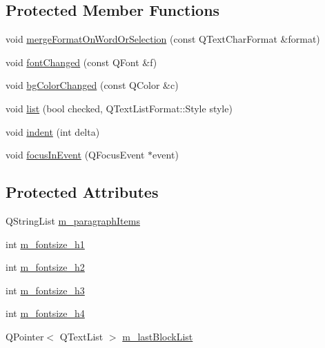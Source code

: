 \subsection*{Protected Member Functions}
\begin{DoxyCompactItemize}
\item 
void \hyperlink{class_m_rich_text_edit_afa3261f0c4458b9303770d2c303f8eae}{merge\+Format\+On\+Word\+Or\+Selection} (const Q\+Text\+Char\+Format \&format)
\item 
void \hyperlink{class_m_rich_text_edit_a863c49639f8ce2cb6d2a42a412ace7ea}{font\+Changed} (const Q\+Font \&f)
\item 
void \hyperlink{class_m_rich_text_edit_aed02db65eb8eafdae00e1f1226a64fa2}{bg\+Color\+Changed} (const Q\+Color \&c)
\item 
void \hyperlink{class_m_rich_text_edit_abeb44a927ac5e727aff6e8655a889cfa}{list} (bool checked, Q\+Text\+List\+Format\+::\+Style style)
\item 
void \hyperlink{class_m_rich_text_edit_ad1185def8aff6d92df93df7d09175602}{indent} (int delta)
\item 
void \hyperlink{class_m_rich_text_edit_a553669aed3e5ade3417fe7244ed6dc3d}{focus\+In\+Event} (Q\+Focus\+Event $\ast$event)
\end{DoxyCompactItemize}
\subsection*{Protected Attributes}
\begin{DoxyCompactItemize}
\item 
Q\+String\+List \hyperlink{class_m_rich_text_edit_af34c4871f9e7e840bd360f4361f71f7f}{m\+\_\+paragraph\+Items}
\item 
int \hyperlink{class_m_rich_text_edit_a21412018cac537d252d926966915f18a}{m\+\_\+fontsize\+\_\+h1}
\item 
int \hyperlink{class_m_rich_text_edit_aa96403182b52ad9d800160ef7da7a5f9}{m\+\_\+fontsize\+\_\+h2}
\item 
int \hyperlink{class_m_rich_text_edit_a554fa39ad6205ca5706f99ac95ff6f71}{m\+\_\+fontsize\+\_\+h3}
\item 
int \hyperlink{class_m_rich_text_edit_ad96b26841fbd45e39a7e7919c7ef9475}{m\+\_\+fontsize\+\_\+h4}
\item 
Q\+Pointer$<$ Q\+Text\+List $>$ \hyperlink{class_m_rich_text_edit_ad6053d0251ea8fb0d315aa9239b26888}{m\+\_\+last\+Block\+List}
\end{DoxyCompactItemize}



